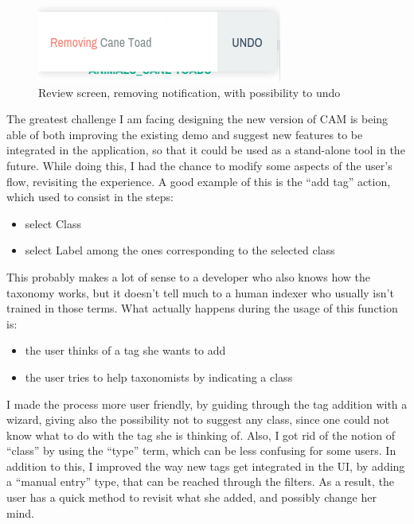 \documentclass[12pt,svgnames]{memoir}
\begin{document}
\begin{figure}[htbp]
\centering
\includegraphics{./src/img/review-notification.png}
\caption{Review screen, removing notification, with possibility to undo}
\end{figure}

The greatest challenge I am facing designing the new version of CAM is
being able of both improving the existing demo and suggest new features
to be integrated in the application, so that it could be used as a
stand-alone tool in the future. While doing this, I had the chance to
modify some aspects of the user's flow, revisiting the experience. A
good example of this is the ``add tag'' action, which used to consist in
the steps:

\begin{itemize}
\itemsep1pt\parskip0pt
\item
  select Class
\item
  select Label among the ones corresponding to the selected class
\end{itemize}

This probably makes a lot of sense to a developer who also knows how the
taxonomy works, but it doesn't tell much to a human indexer who usually
isn't trained in those terms. What actually happens during the usage of
this function is:

\begin{itemize}
\itemsep1pt\parskip0pt
\item
  the user thinks of a tag she wants to add
\item
  the user tries to help taxonomists by indicating a class
\end{itemize}

I made the process more user friendly, by guiding through the tag
addition with a wizard, giving also the possibility not to suggest any
class, since one could not know what to do with the tag she is thinking
of. Also, I got rid of the notion of ``class'' by using the ``type''
term, which can be less confusing for some users. In addition to this, I
improved the way new tags get integrated in the UI, by adding a ``manual
entry'' type, that can be reached through the filters. As a result, the
user has a quick method to revisit what she added, and possibly change
her mind.
\end{document}
